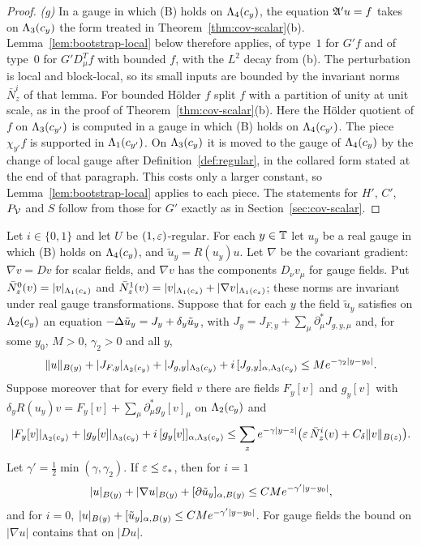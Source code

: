 \begin{proof}
\emph{(g)} In a gauge in which (B) holds on $\Lambda_4(c_y)$, the equation $\mathfrak A'u=f$ takes on $\Lambda_3(c_y)$ the form treated in Theorem~\ref{thm:cov-scalar}(b). Lemma~\ref{lem:bootstrap-local} below therefore applies, of type~$1$ for $G'f$ and of type~$0$ for $G'D^T_\mu f$ with bounded $f$, with the $L^2$ decay from (b). The perturbation is local and block-local, so its small inputs are bounded by the invariant norms $\bar N^i_z$ of that lemma. For bounded H\"older $f$ split $f$ with a partition of unity at unit scale, as in the proof of Theorem~\ref{thm:cov-scalar}(b). Here the H\"older quotient of $f$ on $\Lambda_3(c_{y'})$ is computed in a gauge in which (B) holds on $\Lambda_4(c_{y'})$. The piece $\chi_{y'}f$ is supported in $\Lambda_1(c_{y'})$. On $\Lambda_3(c_y)$ it is moved to the gauge of $\Lambda_4(c_y)$ by the change of local gauge after Definition~\ref{def:regular}, in the collared form stated at the end of that paragraph. This costs only a larger constant, so Lemma~\ref{lem:bootstrap-local} applies to each piece. The statements for $H'$, $C'$, $P_\mathcal V$ and $S$ follow from those for $G'$ exactly as in Section~\ref{sec:cov-scalar}.
\end{proof}

\begin{lemma}\label{lem:bootstrap-local}
Let $i\in\{0,1\}$ and let $U$ be $(1,\varepsilon)$-regular. For each $y\in\mathbb T$ let $u_y$ be a real gauge in which (B) holds on $\Lambda_4(c_y)$, and $\tilde u_y=R(u_y)u$. Let $\nabla$ be the covariant gradient: $\nabla v=Dv$ for scalar fields, and $\nabla v$ has the components $D_\nu v_\mu$ for gauge fields. Put $\bar N^0_z(v)=|v|_{\Lambda_1(c_z)}$ and $\bar N^1_z(v)=|v|_{\Lambda_1(c_z)}+|\nabla v|_{\Lambda_1(c_z)}$; these norms are invariant under real gauge transformations. Suppose that for each $y$ the field $\tilde u_y$ satisfies on $\Lambda_2(c_y)$ an equation $-\Delta\tilde u_y=J_y+\delta_y\tilde u_y$, with $J_y=J_{F,y}+\sum_\mu\partial^*_\mu J_{g,y,\mu}$ and, for some $y_0$, $M>0$, $\gamma_2>0$ and all $y$,
\[
\|u\|_{B(y)}+|J_{F,y}|_{\Lambda_2(c_y)}+|J_{g,y}|_{\Lambda_3(c_y)}+i\,[J_{g,y}]_{\alpha,\Lambda_3(c_y)}\le Me^{-\gamma_2|y-y_0|}.
\]
Suppose moreover that for every field $v$ there are fields $F_y[v]$ and $g_y[v]$ with $\delta_yR(u_y)v=F_y[v]+\sum_\mu\partial^*_\mu g_y[v]_\mu$ on $\Lambda_2(c_y)$ and
\[
|F_y[v]|_{\Lambda_2(c_y)}+|g_y[v]|_{\Lambda_3(c_y)}+i\,[g_y[v]]_{\alpha,\Lambda_3(c_y)}\le\sum_ze^{-\gamma|y-z|}\big(\varepsilon\,\bar N^i_z(v)+C_\delta\|v\|_{B(z)}\big).
\]
Let $\gamma'=\frac12\min(\gamma,\gamma_2)$. If $\varepsilon\le\varepsilon_*$, then for $i=1$
\[
|u|_{B(y)}+|\nabla u|_{B(y)}+[\partial\tilde u_y]_{\alpha,B(y)}\le CMe^{-\gamma'|y-y_0|},
\]
and for $i=0$, $|u|_{B(y)}+[\tilde u_y]_{\alpha,B(y)}\le CMe^{-\gamma'|y-y_0|}$. For gauge fields the bound on $|\nabla u|$ contains that on $|Du|$.
\end{lemma}

